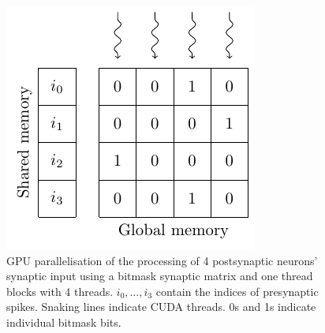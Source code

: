 \documentclass[utf8]{frontiersSCNS} %
\begin{document}
\begin{figure}
    \begin{center}
        \includegraphics{figures/bitmask}
    \end{center}
    \caption{GPU parallelisation of the processing of \num{4} postsynaptic neurons' synaptic input using a bitmask synaptic matrix and one thread blocks with \num{4} threads.
    $i_{0},\ldots,i_{3}$ contain the indices of presynaptic spikes.
    Snaking lines indicate CUDA threads.
    0s and 1s indicate individual bitmask bits.}
    \label{fig:bitmask}
\end{figure}
\end{document}
